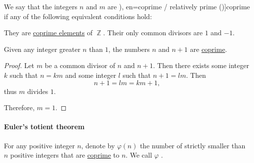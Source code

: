 \begin{definition}\label{def:coprime_numbers}
  We say that the integers \( n \) and \( m \) are \term[ru=взаимно простые (числа) (\cite[45]{Зорич2019АнализТом1}), en=coprime / relatively prime (\cite[231]{Rosen2018DiscreteHandbook})]{coprime} if any of the following equivalent conditions hold:
  \begin{thmenum}
     They are \hyperref[def:coprime_elements]{coprime elements} of \( \BbbZ \).
     Their only common divisors are \( 1 \) and \( -1 \).
  \end{thmenum}
\end{definition}

\begin{proposition}\label{thm:n_plus_1_coprime}
  Given any integer greater \( n \) than \( 1 \), the numbers \( n \) and \( n + 1 \) are \hyperref[def:coprime_elements]{coprime}.
\end{proposition}
\begin{proof}
  Let \( m \) be a common divisor of \( n \) and \( n + 1 \). Then there exists some integer \( k \) such that \( n = km \) and some integer \( l \) such that \( n + 1 = lm \). Then
  \begin{equation*}
    n + 1 = lm = km + 1,
  \end{equation*}
  thus \( m \) divides \( 1 \).

  Therefore, \( m = 1 \).
\end{proof}

\paragraph{Euler's totient theorem}\hfill

\begin{definition}\label{def:eulers_totient_function}
  For any positive integer \( n \), denote by \( \varphi(n) \) the number of strictly smaller than \( n \) positive integers that are \hyperref[def:coprime_elements]{coprime} to \( n \). We call \( \varphi \) .
\end{definition}

